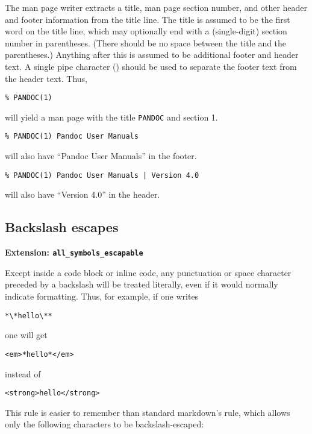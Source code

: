 \documentclass[]{article}
\begin{document}
The man page writer extracts a title, man page section number, and other
header and footer information from the title line. The title is assumed
to be the first word on the title line, which may optionally end with a
(single-digit) section number in parentheses. (There should be no space
between the title and the parentheses.) Anything after this is assumed
to be additional footer and header text. A single pipe character
(\texttt{\textbar{}}) should be used to separate the footer text from
the header text. Thus,

\begin{verbatim}
% PANDOC(1)
\end{verbatim}

will yield a man page with the title \texttt{PANDOC} and section 1.

\begin{verbatim}
% PANDOC(1) Pandoc User Manuals
\end{verbatim}

will also have ``Pandoc User Manuals'' in the footer.

\begin{verbatim}
% PANDOC(1) Pandoc User Manuals | Version 4.0
\end{verbatim}

will also have ``Version 4.0'' in the header.

\subsection{Backslash escapes}

\textbf{Extension: \texttt{all\_symbols\_escapable}}

Except inside a code block or inline code, any punctuation or space
character preceded by a backslash will be treated literally, even if it
would normally indicate formatting. Thus, for example, if one writes

\begin{verbatim}
*\*hello\**
\end{verbatim}

one will get

\begin{verbatim}
<em>*hello*</em>
\end{verbatim}

instead of

\begin{verbatim}
<strong>hello</strong>
\end{verbatim}

This rule is easier to remember than standard markdown's rule, which
allows only the following characters to be backslash-escaped:
\end{document}
